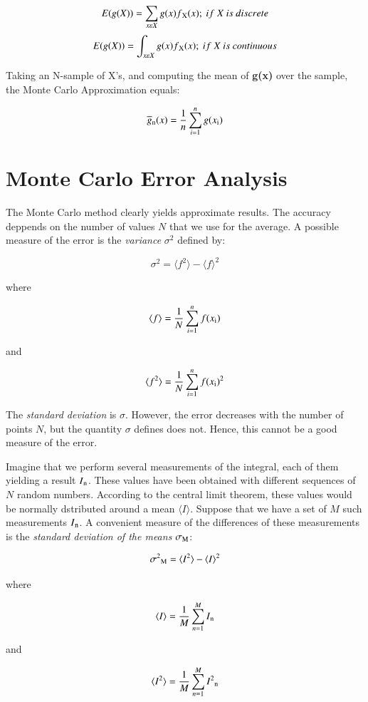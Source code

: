 \documentclass{resonance}
\begin{document}
	$$E(g(X)) = \sum_{x\varepsilon X} g(x)f\textsubscript{X}(x);\ if\ X\ is\ discrete$$
	$$E(g(X)) = \int_{x\varepsilon X} g(x)f\textsubscript{X}(x);\ if\ X\ is\ continuous$$
	
	Taking an N-sample of X’s, and computing the mean of \textbf{g(x)} over the sample, the Monte Carlo Approximation equals:
	
	$$ \overline{g}\textsubscript{n}(x) = \frac{1}{n} \sum_{i=1}^{n}g(x\textsubscript{i}) $$
	
	\section{Monte Carlo Error Analysis}
	The Monte Carlo method clearly yields approximate results. The accuracy deppends on the number of values $N$ that we use for the average. A possible measure of the error is the \emph{variance} $\sigma^2$ defined by:
	
	$$ \sigma^2 = \langle f^2 \rangle - \langle f \rangle^2 $$
	
	where
	
	$$ \langle f \rangle = \frac{1}{N} \sum_{i=1}^{n}f(x\textsubscript{i}) $$
	
	and
	
	$$ \langle f^2 \rangle = \frac{1}{N} \sum_{i=1}^{n}f(x\textsubscript{i})^2 $$
	
	The \emph{standard deviation} is $\sigma$. However, the error decreases with the number of points $N$, but the quantity $\sigma$ defines does not. Hence, this cannot be a good measure of the error.
	
	Imagine that we perform several measurements of the integral, each of them yielding a result $I\textsubscript{n}$. These values have been obtained with different sequences of $N$ random numbers. According to the central limit theorem, these values would be normally dstributed around a mean $\langle I \rangle$. Suppose that we have a set of $M$ such measurements ${I\textsubscript{n}}$. A convenient measure of the differences of these measurements is the \emph{standard deviation of the means} $\sigma\textsubscript{M}$:
	
	$$ \sigma^2\textsubscript{M} = \langle I^2 \rangle - \langle I \rangle^2 $$
	
	where
	
	$$ \langle I \rangle = \frac{1}{M} \sum_{n=1}^{M}I\textsubscript{n} $$
	
	and
	
	$$ \langle I^2 \rangle = \frac{1}{M} \sum_{n=1}^{M}I^2\textsubscript{n} $$
	
\end{document}
